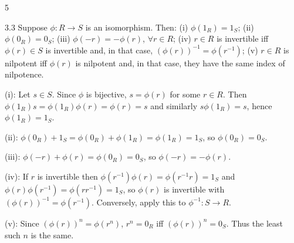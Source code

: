 \documentclass[8pt]{extarticle}
\makeatletter
\renewenvironment{proof}[1][\proofname]{%
  \par%
  \pushQED{\qed}%
  \normalfont
  \topsep=2pt\partopsep=0pt\parsep=0pt\itemsep=0pt%
  \trivlist
  \item[\hskip\labelsep\itshape #1\@addpunct{.}]\ignorespaces
}{%
  \popQED\endtrivlist\@endpefalse
  \vspace{-1pt}%
}
\makeatother
\begin{document}
\begin{multicols*}{5}
{{
            }
        }
        \vspace{-1pt}

        \begin{lemma}{3.3}
            Suppose \(\phi:R\to S\) is an isomorphism. Then: (i) \(\phi(1_R)=1_S\); (ii) \(\phi(0_R)=0_S\); (iii) \(\phi(-r)=-\phi(r)\), \(\forall r\in R\); (iv) \(r\in R\) is invertible iff \(\phi(r)\in S\) is invertible and, in that case, \((\phi(r))^{-1}=\phi(r^{-1})\); (v) \(r\in R\) is nilpotent iff \(\phi(r)\) is nilpotent and, in that case, they have the same index of nilpotence.
        \end{lemma}

        \begin{proof}
            (i): Let \(s\in S\). Since \(\phi\) is bijective, \(s=\phi(r)\) for some \(r\in R\). Then \(\phi(1_R)s=\phi(1_R)\phi(r)=\phi(r)=s\) and similarly \(s\phi(1_R)=s\), hence \(\phi(1_R)=1_S\).

            (ii): \(\phi(0_R)+1_S=\phi(0_R)+\phi(1_R)=\phi(1_R)=1_S\), so \(\phi(0_R)=0_S\).

            (iii): \(\phi(-r)+\phi(r)=\phi(0_R)=0_S\), so \(\phi(-r)=-\phi(r)\).

            (iv): If \(r\) is invertible then \(\phi(r^{-1})\phi(r)=\phi(r^{-1}r)=1_S\) and \(\phi(r)\phi(r^{-1})=\phi(rr^{-1})=1_S\), so \(\phi(r)\) is invertible with \((\phi(r))^{-1}=\phi(r^{-1})\). Conversely, apply this to \(\phi^{-1}:S\to R\).

            (v): Since \((\phi(r))^n=\phi(r^n)\), \(r^n=0_R\) iff \((\phi(r))^n=0_S\). Thus the least such \(n\) is the same.
        \end{proof}


\end{multicols*}
\end{document}
